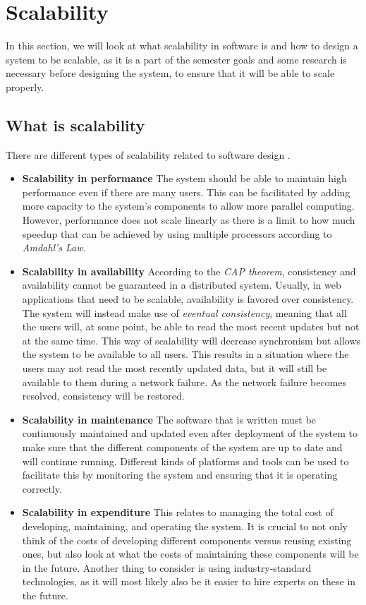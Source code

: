 \section{Scalability}\label{sec:scalability}
In this section, we will look at what scalability in software is and how to design a system to be scalable, as it is a part of the semester goals and some research is necessary before designing the system, to ensure that it will be able to scale properly.

\subsection{What is scalability}
There are different types of scalability related to software design \cite{ScalabilityDesignPrinciples}.
\begin{itemize}
    \item \textbf{Scalability in performance} The system should be able to maintain high performance even if there are many users. This can be facilitated by adding more capacity to the system's components to allow more parallel computing. 
    However, performance does not scale linearly as there is a limit to how much speedup that can be achieved by using multiple processors according to \textit{Amdahl's Law}. 
    \item \textbf{Scalability in availability} According to the \textit{CAP theorem}, consistency and availability cannot be guaranteed in a distributed system. 
    Usually, in web applications that need to be scalable, availability is favored over consistency. 
    The system will instead make use of \textit{eventual consistency}, meaning that all the users will, at some point, be able to read the most recent updates but not at the same time. 
    This way of scalability will decrease synchronism but allows the system to be available to all users.
    This results in a situation where the users may not read the most recently updated data, but it will still be available to them during a network failure.
    As the network failure becomes resolved, consistency will be restored.
    \item \textbf{Scalability in maintenance} The software that is written must be continuously maintained and updated even after deployment of the system to make sure that the different components of the system are up to date and will continue running. 
    Different kinds of platforms and tools can be used to facilitate this by monitoring the system and ensuring that it is operating correctly. 
    \item \textbf{Scalability in expenditure} This relates to managing the total cost of developing, maintaining, and operating the system. 
    It is crucial to not only think of the costs of developing different components versus reusing existing ones, but also look at what the costs of maintaining these components will be in the future. 
    Another thing to consider is using industry-standard technologies, as it will most likely also be it easier to hire experts on these in the future.
\end{itemize}

